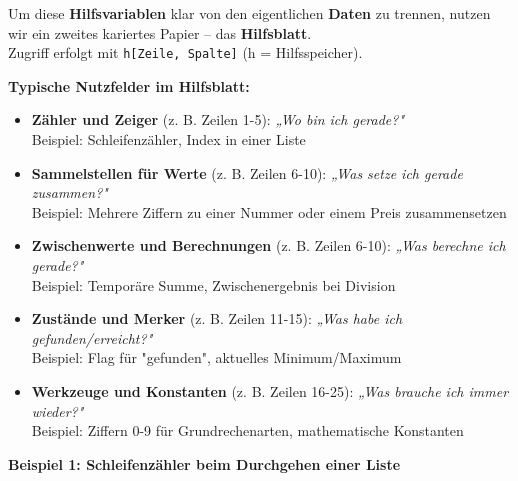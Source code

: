 \documentclass{article}
\begin{document}
        
Um diese \textbf{Hilfsvariablen} klar von den eigentlichen \textbf{Daten} zu trennen, nutzen wir ein zweites kariertes Papier – das \textbf{Hilfsblatt}.\\
          Zugriff erfolgt mit \texttt{h[Zeile, Spalte]} (h = Hilfsspeicher).


        
\textbf{Typische Nutzfelder im Hilfsblatt:}

        \begin{itemize}
          \item \textbf{Zähler und Zeiger} (z. B. Zeilen 1-5): \emph{„Wo bin ich gerade?"}\\
              Beispiel: Schleifenzähler, Index in einer Liste
          

          \item \textbf{Sammelstellen für Werte} (z. B. Zeilen 6-10): \emph{„Was setze ich gerade zusammen?"}\\
            Beispiel: Mehrere Ziffern zu einer Nummer oder einem Preis zusammensetzen
          

          \item \textbf{Zwischenwerte und Berechnungen} (z. B. Zeilen 6-10): \emph{„Was berechne ich gerade?"}\\
              Beispiel: Temporäre Summe, Zwischenergebnis bei Division
          

          \item \textbf{Zustände und Merker} (z. B. Zeilen 11-15): \emph{„Was habe ich gefunden/erreicht?"}\\
              Beispiel: Flag für "gefunden", aktuelles Minimum/Maximum
          

          \item \textbf{Werkzeuge und Konstanten} (z. B. Zeilen 16-25): \emph{„Was brauche ich immer wieder?"}\\
              Beispiel: Ziffern 0-9 für Grundrechenarten, mathematische Konstanten
          

        \end{itemize}

        
\textbf{Beispiel 1: Schleifenzähler beim Durchgehen einer Liste}
\end{document}

